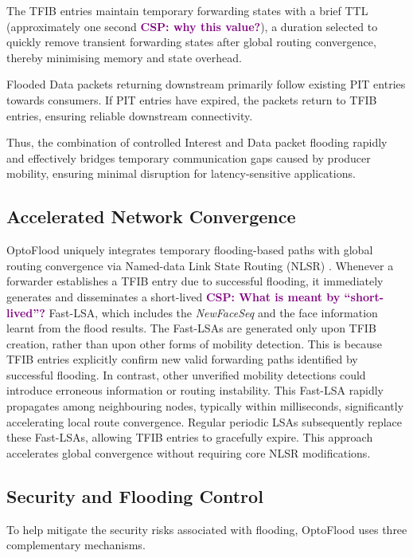 \documentclass[10pt,conference]{IEEEtran}
\newcommand{\csp}[1]{\textbf{\textcolor{purple}{CSP: #1}}}
\begin{document}
The TFIB entries maintain temporary forwarding states with a brief TTL (approximately one second \csp{why this value?}), a duration selected to quickly remove transient forwarding states after global routing convergence, thereby minimising memory and state overhead.

Flooded Data packets returning downstream primarily follow existing PIT entries towards consumers. If PIT entries have expired, the packets return to TFIB entries, ensuring reliable downstream connectivity.

Thus, the combination of controlled Interest and Data packet flooding rapidly and effectively bridges temporary communication gaps caused by producer mobility, ensuring minimal disruption for latency-sensitive applications.


\subsection{Accelerated Network Convergence}
\label{sec:solution:convergence}

OptoFlood uniquely integrates temporary flooding-based paths with global routing convergence via Named-data Link State Routing (NLSR) \cite{}. Whenever a forwarder establishes a TFIB entry due to successful flooding, it immediately generates and disseminates a short-lived \csp{What is meant by ``short-lived''?} Fast-LSA, which includes the \textit{NewFaceSeq} and the face information learnt from the flood results. The Fast-LSAs are generated only upon TFIB creation, rather than upon other forms of mobility detection. This is because TFIB entries explicitly confirm new valid forwarding paths identified by successful flooding. In contrast, other unverified mobility detections could introduce erroneous information or routing instability. This Fast-LSA rapidly propagates among neighbouring nodes, typically within milliseconds, significantly accelerating local route convergence. Regular periodic LSAs subsequently replace these Fast-LSAs, allowing TFIB entries to gracefully expire. This approach accelerates global convergence without requiring core NLSR modifications.

\subsection{Security and Flooding Control}

To help mitigate the security risks associated with flooding, OptoFlood uses three complementary mechanisms.
\end{document}
